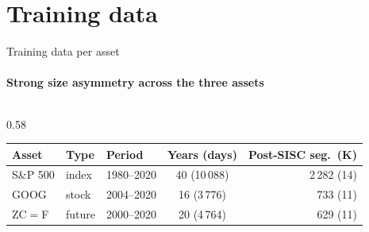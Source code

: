 \section{Training data}

\begin{frame}{Training data per asset}
\framesubtitle{Strong size asymmetry across the three assets}
\vspace{-3mm}

\begin{columns}[T,onlytextwidth]
\begin{column}{0.58\textwidth}\centering\scriptsize
\begin{tabular}{@{}lllcr@{}}
\toprule
\textbf{Asset} & \textbf{Type} & \textbf{Period} & \textbf{Years (days)} & \textbf{Post-SISC seg.\ (K)}\\
\midrule
S\&P 500 & index  & 1980--2020 & 40 (10\,088)    & 2\,282 (14)\\
GOOG     & stock  & 2004--2020 & 16 \phantom{0}(3\,776) & \phantom{0}\phantom{0}733 (11)\\
ZC$=$F   & future & 2000--2020 & 20 \phantom{0}(4\,764) & \phantom{0}\phantom{0}629 (11)\\
\bottomrule
\end{tabular}


\end{column}
\end{columns}
\end{frame}
